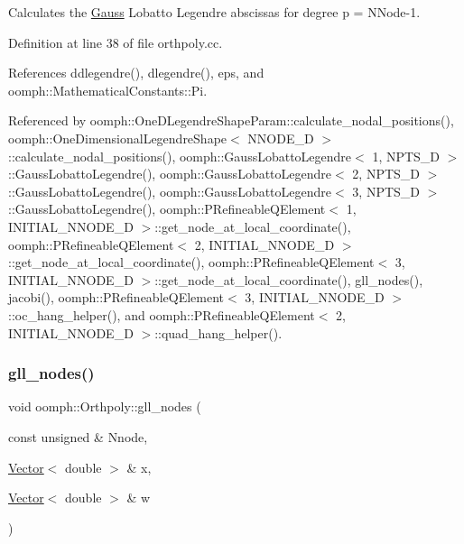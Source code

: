 Calculates the \hyperlink{classoomph_1_1Gauss}{Gauss} Lobatto Legendre abscissas for degree p = N\+Node-\/1. 



Definition at line 38 of file orthpoly.\+cc.



References ddlegendre(), dlegendre(), eps, and oomph\+::\+Mathematical\+Constants\+::\+Pi.



Referenced by oomph\+::\+One\+D\+Legendre\+Shape\+Param\+::calculate\+\_\+nodal\+\_\+positions(), oomph\+::\+One\+Dimensional\+Legendre\+Shape$<$ N\+N\+O\+D\+E\+\_\+D $>$\+::calculate\+\_\+nodal\+\_\+positions(), oomph\+::\+Gauss\+Lobatto\+Legendre$<$ 1, N\+P\+T\+S\+\_\+D $>$\+::\+Gauss\+Lobatto\+Legendre(), oomph\+::\+Gauss\+Lobatto\+Legendre$<$ 2, N\+P\+T\+S\+\_\+D $>$\+::\+Gauss\+Lobatto\+Legendre(), oomph\+::\+Gauss\+Lobatto\+Legendre$<$ 3, N\+P\+T\+S\+\_\+D $>$\+::\+Gauss\+Lobatto\+Legendre(), oomph\+::\+P\+Refineable\+Q\+Element$<$ 1, I\+N\+I\+T\+I\+A\+L\+\_\+\+N\+N\+O\+D\+E\+\_\+D $>$\+::get\+\_\+node\+\_\+at\+\_\+local\+\_\+coordinate(), oomph\+::\+P\+Refineable\+Q\+Element$<$ 2, I\+N\+I\+T\+I\+A\+L\+\_\+\+N\+N\+O\+D\+E\+\_\+D $>$\+::get\+\_\+node\+\_\+at\+\_\+local\+\_\+coordinate(), oomph\+::\+P\+Refineable\+Q\+Element$<$ 3, I\+N\+I\+T\+I\+A\+L\+\_\+\+N\+N\+O\+D\+E\+\_\+D $>$\+::get\+\_\+node\+\_\+at\+\_\+local\+\_\+coordinate(), gll\+\_\+nodes(), jacobi(), oomph\+::\+P\+Refineable\+Q\+Element$<$ 3, I\+N\+I\+T\+I\+A\+L\+\_\+\+N\+N\+O\+D\+E\+\_\+D $>$\+::oc\+\_\+hang\+\_\+helper(), and oomph\+::\+P\+Refineable\+Q\+Element$<$ 2, I\+N\+I\+T\+I\+A\+L\+\_\+\+N\+N\+O\+D\+E\+\_\+D $>$\+::quad\+\_\+hang\+\_\+helper().

\mbox{\label{namespaceoomph_1_1Orthpoly_a49a1cd8050963fdbf455f520e8a8b228}} 
\subsubsection{\texorpdfstring{gll\+\_\+nodes()}{gll\_nodes()}\hspace{0.1cm}{\footnotesize\ttfamily [2/2]}}
{\footnotesize\ttfamily void oomph\+::\+Orthpoly\+::gll\+\_\+nodes (\begin{DoxyParamCaption}\item[{const unsigned \&}]{Nnode,  }\item[{\hyperlink{classoomph_1_1Vector}{Vector}$<$ double $>$ \&}]{x,  }\item[{\hyperlink{classoomph_1_1Vector}{Vector}$<$ double $>$ \&}]{w }\end{DoxyParamCaption})}




